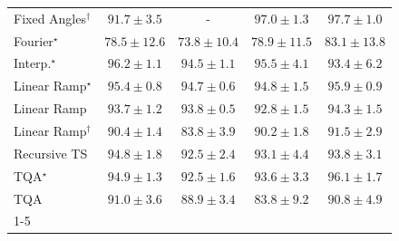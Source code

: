 \begin{tabular}{l|cccc|}
Fixed Angles$^\dagger$ & {\cellcolor[HTML]{045E93}} \color[HTML]{F1F1F1} $91.7\pm 3.5$ & {\cellcolor[HTML]{000000}} \color[HTML]{F1F1F1} {\cellcolor{white}} \color{black} - & {\cellcolor[HTML]{023F64}} \color[HTML]{F1F1F1} $97.0\pm 1.3$ & {\cellcolor[HTML]{023B5D}} \color[HTML]{F1F1F1} $97.7\pm 1.0$ \\
Fourier$^\star$ & {\cellcolor[HTML]{529BC7}} \color[HTML]{F1F1F1} $78.5\pm 12.6$ & {\cellcolor[HTML]{81AED2}} \color[HTML]{F1F1F1} $73.8\pm 10.4$ & {\cellcolor[HTML]{4E9AC6}} \color[HTML]{F1F1F1} $78.9\pm 11.5$ & {\cellcolor[HTML]{2685BB}} \color[HTML]{F1F1F1} $83.1\pm 13.8$ \\
Interp.$^\star$ & {\cellcolor[HTML]{03456C}} \color[HTML]{F1F1F1} $96.2\pm 1.1$ & {\cellcolor[HTML]{034E7B}} \color[HTML]{F1F1F1} $94.5\pm 1.1$ & {\cellcolor[HTML]{034973}} \color[HTML]{F1F1F1} $95.5\pm 4.1$ & {\cellcolor[HTML]{045585}} \color[HTML]{F1F1F1} $93.4\pm 6.2$ \\
Linear Ramp$^\star$ & {\cellcolor[HTML]{034973}} \color[HTML]{F1F1F1} $95.4\pm 0.8$ & {\cellcolor[HTML]{034D79}} \color[HTML]{F1F1F1} $94.7\pm 0.6$ & {\cellcolor[HTML]{034D79}} \color[HTML]{F1F1F1} $94.8\pm 1.5$ & {\cellcolor[HTML]{03466E}} \color[HTML]{F1F1F1} $95.9\pm 0.9$ \\
Linear Ramp & {\cellcolor[HTML]{045483}} \color[HTML]{F1F1F1} $93.7\pm 1.2$ & {\cellcolor[HTML]{045382}} \color[HTML]{F1F1F1} $93.8\pm 0.5$ & {\cellcolor[HTML]{04598C}} \color[HTML]{F1F1F1} $92.8\pm 1.5$ & {\cellcolor[HTML]{034F7D}} \color[HTML]{F1F1F1} $94.3\pm 1.5$ \\
Linear Ramp$^\dagger$ & {\cellcolor[HTML]{04629A}} \color[HTML]{F1F1F1} $90.4\pm 1.4$ & {\cellcolor[HTML]{2081B9}} \color[HTML]{F1F1F1} $83.8\pm 3.9$ & {\cellcolor[HTML]{04639B}} \color[HTML]{F1F1F1} $90.2\pm 1.8$ & {\cellcolor[HTML]{045E94}} \color[HTML]{F1F1F1} $91.5\pm 2.9$ \\
Recursive TS & {\cellcolor[HTML]{034D79}} \color[HTML]{F1F1F1} $94.8\pm 1.8$ & {\cellcolor[HTML]{045A8D}} \color[HTML]{F1F1F1} $92.5\pm 2.4$ & {\cellcolor[HTML]{045788}} \color[HTML]{F1F1F1} $93.1\pm 4.4$ & {\cellcolor[HTML]{045382}} \color[HTML]{F1F1F1} $93.8\pm 3.1$ \\
TQA$^\star$ & {\cellcolor[HTML]{034C78}} \color[HTML]{F1F1F1} $94.9\pm 1.3$ & {\cellcolor[HTML]{045A8D}} \color[HTML]{F1F1F1} $92.5\pm 1.6$ & {\cellcolor[HTML]{045483}} \color[HTML]{F1F1F1} $93.6\pm 3.3$ & {\cellcolor[HTML]{03456C}} \color[HTML]{F1F1F1} $96.1\pm 1.7$ \\
TQA & {\cellcolor[HTML]{046097}} \color[HTML]{F1F1F1} $91.0\pm 3.6$ & {\cellcolor[HTML]{0568A3}} \color[HTML]{F1F1F1} $88.9\pm 3.4$ & {\cellcolor[HTML]{2081B9}} \color[HTML]{F1F1F1} $83.8\pm 9.2$ & {\cellcolor[HTML]{046198}} \color[HTML]{F1F1F1} $90.8\pm 4.9$ \\
\cline{1-5}
\bottomrule
\end{tabular}
